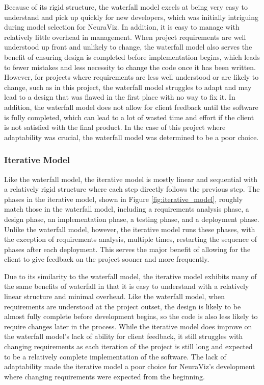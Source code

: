 Because of its rigid structure, the waterfall model excels at being very easy to understand and pick up quickly for new developers, which was initially intriguing during model selection for NeuraViz. In addition, it is easy to manage with relatively little overhead in management. When project requirements are well understood up front and unlikely to change, the waterfall model also serves the benefit of ensuring design is completed before implementation begins, which leads to fewer mistakes and less necessity to change the code once it has been written. However, for projects where requirements are less well understood or are likely to change, such as in this project, the waterfall model struggles to adapt and may lead to a design that was flawed in the first place with no way to fix it. In addition, the waterfall model does not allow for client feedback until the software is fully completed, which can lead to a lot of wasted time and effort if the client is not satisfied with the final product. In the case of this project where adaptability was crucial, the waterfall model was determined to be a poor choice.

\subsubsection{Iterative Model}
Like the waterfall model, the iterative model is mostly linear and sequential with a relatively rigid structure where each step directly follows the previous step. The phases in the iterative model, shown in Figure \ref{fig:iterative_model}, roughly match those in the waterfall model, including a requirements analysis phase, a design phase, an implementation phase, a testing phase, and a deployment phase. Unlike the waterfall model, however, the iterative model runs these phases, with the exception of requirements analysis, multiple times, restarting the sequence of phases after each deployment. This serves the major benefit of allowing for the client to give feedback on the project sooner and more frequently.

Due to its similarity to the waterfall model, the iterative model exhibits many of the same benefits of waterfall in that it is easy to understand with a relatively linear structure and minimal overhead. Like the waterfall model, when requirements are understood at the project outset, the design is likely to be almost fully complete before development begins, so the code is also less likely to require changes later in the process. While the iterative model does improve on the waterfall model's lack of ability for client feedback, it still struggles with changing requirements as each iteration of the project is still long and expected to be a relatively complete implementation of the software. The lack of adaptability made the iterative model a poor choice for NeuraViz's development where changing requirements were expected from the beginning.

